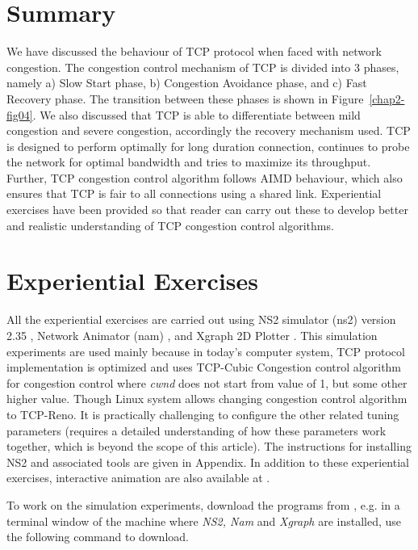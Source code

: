 \begin{multicols}{2}
\section{Summary}

We have discussed the behaviour of TCP protocol when faced with network congestion. The congestion control mechanism of TCP is divided into 3 phases, namely a) Slow Start phase, b) Congestion Avoidance phase, and c) Fast Recovery phase. The transition between these phases is shown in Figure~\ref{chap2-fig04}. We also discussed that TCP is able to differentiate between mild congestion and severe congestion, accordingly  the recovery mechanism used. TCP is designed to perform optimally for long duration connection, continues to probe the network for optimal bandwidth and tries to maximize its throughput. Further, TCP congestion control algorithm follows AIMD behaviour, which also ensures that TCP is fair to all connections using a shared link. Experiential exercises have been provided so that reader can carry out these to develop better and realistic understanding of TCP congestion control algorithms.

\section{Experiential Exercises}

All the experiential exercises are carried out using NS2 simulator (ns2) version 2.35 \cite{art2-key09}, Network Animator (nam) \cite{art2-key10}, and Xgraph 2D Plotter \cite{art2-key11}. This simulation experiments are used mainly because in today’s computer system, TCP protocol implementation is optimized and uses TCP-Cubic Congestion control algorithm for congestion control where \textit{cwnd} does not start from value of 1, but some other higher value. Though Linux system allows changing congestion control algorithm to TCP-Reno. It is practically challenging to configure the other related tuning parameters (requires a detailed understanding of how these parameters work together, which is beyond the scope of this article). The instructions for installing NS2 and associated tools are given in Appendix. In addition to these experiential exercises, interactive animation are also available at \cite{art2-key14}.

To work on the simulation experiments, download the programs from \cite{art2-key12}, e.g. in a terminal window of the machine where \textit{NS2, Nam} and \textit{Xgraph} are installed, use the following command to download.
 

\end{multicols}
